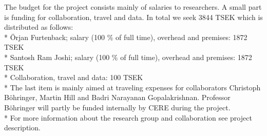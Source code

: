 The budget for the project consists mainly of salaries to researchers. A small part is funding
for collaboration, travel and data. In total we seek 3844 TSEK which is distributed as follows:\\*
\indent Örjan Furtenback; salary (100 \% of full time), overhead and premises: 1872 TSEK\\*
\indent Santosh Ram Joshi; salary (100 \% of full time), overhead and premises: 1872 TSEK\\*
\indent Collaboration, travel and data: 100 TSEK\\*
The last item is mainly aimed at traveling expenses for collaborators Christoph Böhringer, Martin Hill and Badri Narayanan Gopalakrishnan. Professor Böhringer will partly be funded internally by CERE during the project.\\*
For more information about the research group and collaboration see project description.
